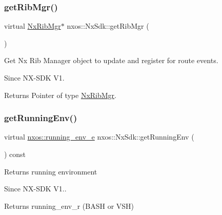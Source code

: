 \subsubsection{\texorpdfstring{get\+Rib\+Mgr()}{getRibMgr()}}
{\footnotesize\ttfamily virtual \mbox{\hyperlink{classnxos_1_1_nx_rib_mgr}{Nx\+Rib\+Mgr}}$\ast$ nxos\+::\+Nx\+Sdk\+::get\+Rib\+Mgr (\begin{DoxyParamCaption}{ }\end{DoxyParamCaption})\hspace{0.3cm}{\ttfamily [pure virtual]}}

Get Nx Rib Manager object to update and register for route events.

\begin{DoxySince}{Since}
N\+X-\/\+S\+DK V1.
\end{DoxySince}
\begin{DoxyReturn}{Returns}
Pointer of type \mbox{\hyperlink{classnxos_1_1_nx_rib_mgr}{Nx\+Rib\+Mgr}}. 
\end{DoxyReturn}
\mbox{\label{classnxos_1_1_nx_sdk_a6ebf9ceb029ce71ecfead7d9183ae4e3}} 
\subsubsection{\texorpdfstring{get\+Running\+Env()}{getRunningEnv()}}
{\footnotesize\ttfamily virtual \mbox{\hyperlink{namespacenxos_a5d2faf90d8673c5bf207f3883d3ca506}{nxos\+::running\+\_\+env\+\_\+e}} nxos\+::\+Nx\+Sdk\+::get\+Running\+Env (\begin{DoxyParamCaption}{ }\end{DoxyParamCaption}) const\hspace{0.3cm}{\ttfamily [pure virtual]}}

Returns running environment

\begin{DoxySince}{Since}
N\+X-\/\+S\+DK V1..
\end{DoxySince}
\begin{DoxyReturn}{Returns}
running\+\_\+env\+\_\+r (B\+A\+SH or V\+SH) 
\end{DoxyReturn}
\mbox{\label{classnxos_1_1_nx_sdk_a5050e2d26c40744b4fc7862068a83f39}} 
